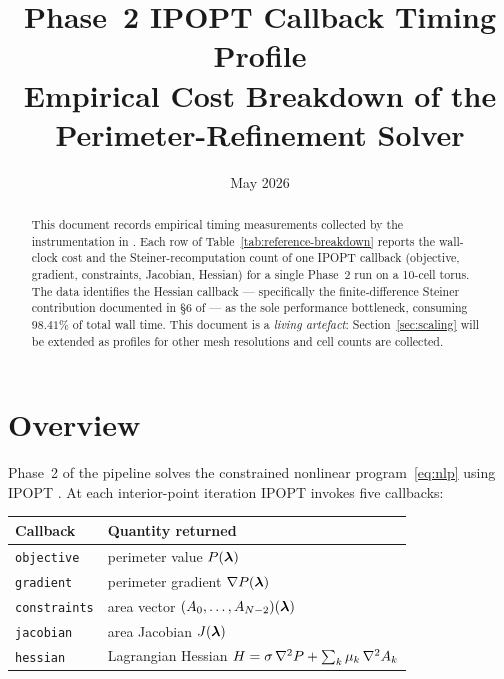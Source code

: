 \documentclass[11pt,a4paper]{article}
\title{%
  \textbf{Phase~2 IPOPT Callback Timing Profile}\\[0.5em]
  \large Empirical Cost Breakdown of the Perimeter-Refinement Solver
}
\author{}
\date{May 2026}
\begin{document}
\maketitle

\begin{abstract}
This document records empirical timing measurements collected by the
 instrumentation in .
Each row of Table~\ref{tab:reference-breakdown} reports the wall-clock
cost and the Steiner-recomputation count of one IPOPT callback
(objective, gradient, constraints, Jacobian, Hessian) for a single
Phase~2 run on a 10-cell torus.  The data identifies the Hessian
callback --- specifically the finite-difference Steiner contribution
documented in \S{}6 of  --- as the sole
performance bottleneck, consuming $98.41\%$ of total wall time.  This
document is a \emph{living artefact}: Section~\ref{sec:scaling} will be
extended as profiles for other mesh resolutions and cell counts are
collected.
\end{abstract}

\tableofcontents
\newpage

\section{Overview}

Phase~2 of the  pipeline solves the
constrained nonlinear program~\eqref{eq:nlp} using IPOPT
\cite{wachter2006ipopt}.  At each interior-point iteration IPOPT
invokes five callbacks:

\begin{center}
\renewcommand{\arraystretch}{1.2}
\begin{tabular}{ll}
\toprule
\textbf{Callback} & \textbf{Quantity returned} \\
\midrule
\texttt{objective}   & perimeter value $P(\boldsymbol{\lambda})$ \\
\texttt{gradient}    & perimeter gradient $\nabla P(\boldsymbol{\lambda})$ \\
\texttt{constraints} & area vector $(A_0,\ldots,A_{N-2})(\boldsymbol{\lambda})$ \\
\texttt{jacobian}    & area Jacobian $J(\boldsymbol{\lambda})$ \\
\texttt{hessian}     & Lagrangian Hessian $H = \sigma\,\nabla^2 P + \sum_k \mu_k\,\nabla^2 A_k$ \\
\bottomrule
\end{tabular}
\end{center}
\end{document}
